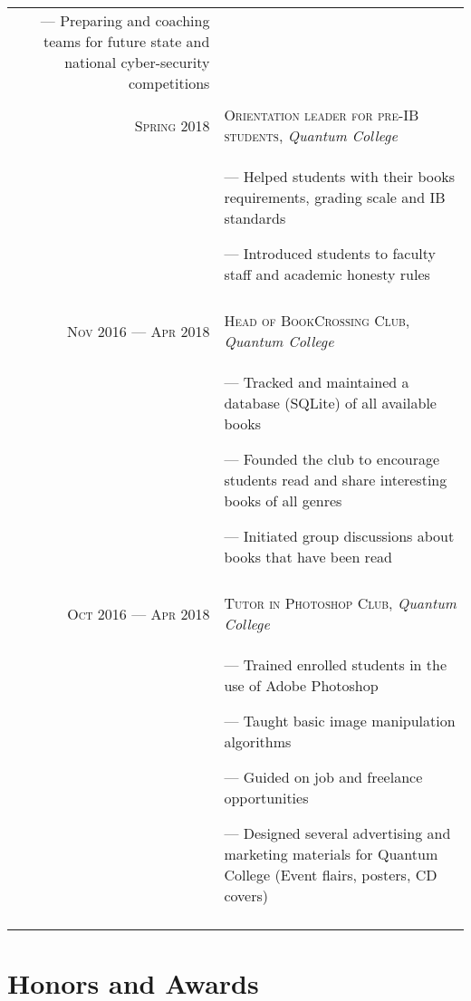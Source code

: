 \documentclass[a4paper, 10pt]{article}
\begin{document}
\begin{tabular}{r|p{11cm}}
{		--- Preparing and coaching teams for future state and national cyber-security competitions
	}                                                                                                        \\\multicolumn{2}{c}{}\\

	\textsc{Spring 2018}           & \textsc{Orientation leader for pre-IB students}, \emph{Quantum College} \\&\footnotesize{
		--- Helped students with their books requirements, grading scale and IB standards

		--- Introduced students to faculty staff and academic honesty rules
	}                                                                                                        \\\multicolumn{2}{c}{}\\

	\textsc{Nov 2016 --- Apr 2018} & \textsc{Head of BookCrossing Club}, \emph{Quantum College}              \\&\footnotesize{
		--- Tracked and maintained a database (SQLite) of all available books

		--- Founded the club to encourage students read and share interesting books of all genres

		--- Initiated group discussions about books that have been read
	}                                                                                                        \\\multicolumn{2}{c}{}\\

	\textsc{Oct 2016 --- Apr 2018} & \textsc{Tutor in Photoshop Club}, \emph{Quantum College}                \\&\footnotesize{
		--- Trained enrolled students in the use of Adobe Photoshop

		--- Taught basic image manipulation algorithms

		--- Guided on job and freelance opportunities

		--- Designed several advertising and marketing materials for Quantum College (Event flairs, posters, CD covers)
	}                                                                                                        \\\multicolumn{2}{c}{}\\
\end{tabular}

\section{Honors and Awards}
\end{document}
